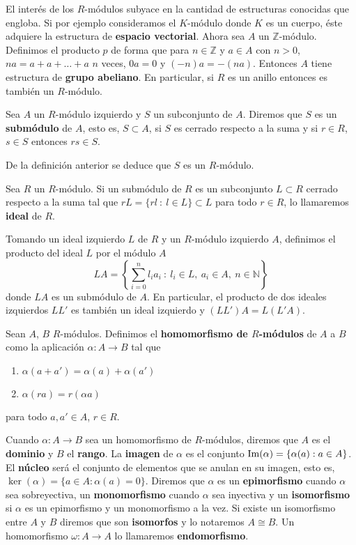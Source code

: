 \begin{ejemplo}
	El interés de los $R$-módulos subyace en la cantidad de estructuras conocidas que engloba. Si por ejemplo consideramos el $K$-módulo donde $K$ es un cuerpo, éste adquiere la estructura de \textbf{espacio vectorial}. Ahora sea $A$ un $\mathbb{Z}$-módulo. Definimos el producto $p$ de forma que para $n \in \mathbb{Z}$ y $a \in A$ con $n>0$, $na = a + a + \dots + a$ $n$ veces, $0a=0$ y $(-n)a = -(na)$. Entonces $A$ tiene estructura de \textbf{grupo abeliano}. En particular, si $R$ es un anillo entonces es también un $R$-módulo.
\end{ejemplo}

\begin{definicion}
	Sea $A$ un $R$-módulo izquierdo y $S$ un subconjunto de $A$. Diremos que $S$ es un \textbf{submódulo} de $A$, esto es, $S \subset A$, si $S$ es cerrado respecto a la suma y si $r \in R$, $s \in S$ entonces $rs \in S$.
\end{definicion}
De la definición anterior se deduce que $S$ es un $R$-módulo.
\begin{definicion} 
Sea $R$ un $R$-módulo.	Si un submódulo de $R$ es un subconjunto $L \subset R$ cerrado respecto a la suma tal que $rL = \{rl \ : \ l \in L\} \subset L$ para todo $r \in R$, lo llamaremos \textbf{ideal} de $R$.
\end{definicion}

Tomando un ideal izquierdo $L$ de $R$ y un $R$-módulo izquierdo $A$, definimos el producto del ideal $L$ por el módulo $A$
\[ LA = \left\lbrace \sum_{i=0}^n l_ia_i \ : \ l_i \in L,\ a_i \in A,\ n \in \mathbb{N} \right\rbrace \]
donde $LA$ es un submódulo de $A$. En particular, el producto de dos ideales izquierdos $LL'$ es también un ideal izquierdo y $(LL')A = L(L'A)$.

\begin{definicion}
	Sean $A$, $B$ $R$-módulos. Definimos el \textbf{homomorfismo de $R$-módulos} de $A$ a $B$ como la aplicación $\alpha: A \rightarrow B$ tal que
	\begin{enumerate}
		\item $\alpha(a+a') = \alpha(a) + \alpha(a')$
		\item $\alpha(ra) = r(\alpha a)$
	\end{enumerate}
	para todo $a,a' \in A$, $r \in R$.
\end{definicion}

Cuando $\alpha: A \rightarrow B$ sea un homomorfismo de $R$-módulos, diremos que $A$ es el \textbf{dominio} y $B$ el \textbf{rango}. La \textbf{imagen} de $\alpha$ es el conjunto $\operatorname{Im}(\alpha) = \{ \alpha(a) : a \in A \}$. El \textbf{núcleo} será el conjunto de elementos que se anulan en su imagen, esto es, $\ker(\alpha) = \{ a \in A : \alpha(a) = 0 \}$. Diremos que $\alpha$ es un \textbf{epimorfismo} cuando $\alpha$ sea sobreyectiva, un \textbf{monomorfismo} cuando $\alpha$ sea inyectiva y un \textbf{isomorfismo} si $\alpha$ es un epimorfismo y un monomorfismo a la vez. Si existe un isomorfismo entre $A$ y $B$ diremos que son \textbf{isomorfos} y lo notaremos $A \cong B$. Un homomorfismo $\omega: A \rightarrow A$ lo llamaremos \textbf{endomorfismo}.

